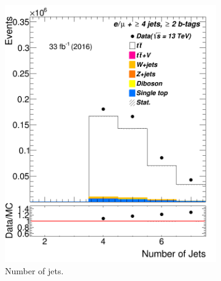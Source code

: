\begin{figure} [b]%
	\centering
\begin{subfigure}{0.25\textwidth}
	\includegraphics[width=\linewidth]{ControlPlots_emujets_2016_4incl_2incl/jet_n_emujets_2016.png}
	\caption{Number of jets.} \label{fig:Sec1}
\end{subfigure}
\hspace*{0.5cm}
\begin{subfigure}{0.25\textwidth}

\end{subfigure}
\end{figure}
